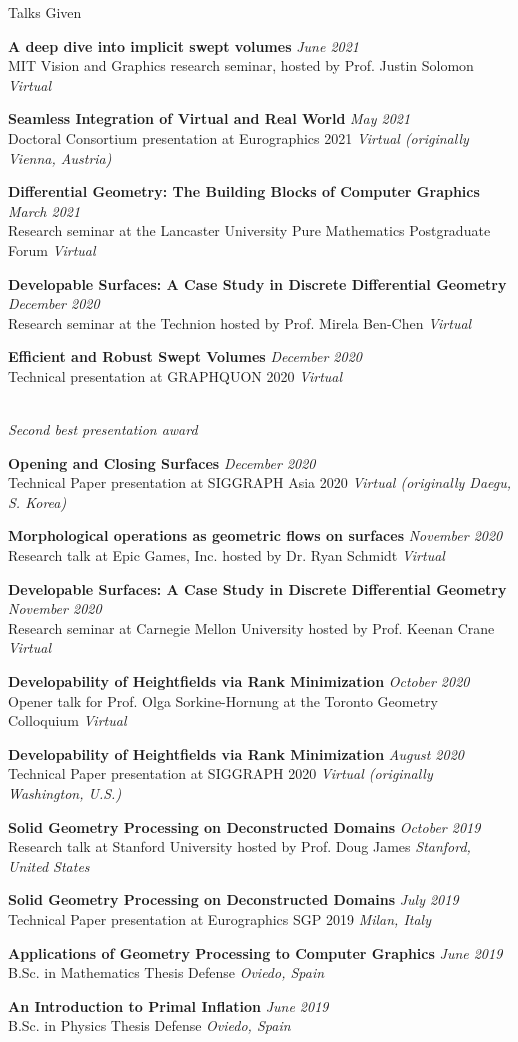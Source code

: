 \documentclass{resume}
\newcommand{\talk}[4]{
    {\bf #1} \hfill {\em \small #2} \\ %
    {\small #3} \hfill {\em \small #4}
}
\begin{document}
\begin{rSection}{Talks Given}
\talk{A deep dive into implicit swept volumes}{June 2021}
{MIT Vision and Graphics research seminar, hosted by Prof. Justin Solomon}{Virtual}

\talk{Seamless Integration of Virtual and Real World}{May 2021}
{Doctoral Consortium presentation at Eurographics 2021}{Virtual (originally Vienna, Austria)}

\talk{Differential Geometry: The Building Blocks of Computer Graphics}{March 2021}
{Research seminar at the Lancaster University Pure Mathematics Postgraduate Forum}{Virtual}

\talk{Developable Surfaces: A Case Study in Discrete Differential Geometry}{December 2020}
{Research seminar at the Technion hosted by Prof. Mirela Ben-Chen}{Virtual}

\talk{Efficient and Robust Swept Volumes}{December 2020}
{Technical presentation at GRAPHQUON 2020}{Virtual}
\\{\it Second best presentation award}

\talk{Opening and Closing Surfaces}{December 2020}
{Technical Paper presentation at SIGGRAPH Asia 2020}{Virtual (originally Daegu, S. Korea)}

\talk{Morphological operations as geometric flows on surfaces}{November 2020}
{Research talk at Epic Games, Inc. hosted by Dr. Ryan Schmidt}{Virtual}

\talk{Developable Surfaces: A Case Study in Discrete Differential Geometry}{November 2020}
{Research seminar at Carnegie Mellon University hosted by Prof. Keenan Crane}{Virtual}

\talk{Developability of Heightfields via Rank Minimization}{October 2020}
{Opener talk for Prof. Olga Sorkine-Hornung at the Toronto Geometry Colloquium}{Virtual}

\talk{Developability of Heightfields via Rank Minimization}{August 2020}
{Technical Paper presentation at SIGGRAPH 2020}{Virtual (originally Washington, U.S.)}

\talk{Solid Geometry Processing on Deconstructed Domains}{October 2019}
{Research talk at Stanford University hosted by Prof. Doug James}{Stanford, United States}

\talk{Solid Geometry Processing on Deconstructed Domains}{July 2019}
{Technical Paper presentation at Eurographics SGP 2019}{Milan, Italy}

\talk{Applications of Geometry Processing to Computer Graphics}{June 2019}
{B.Sc. in Mathematics Thesis Defense}{Oviedo, Spain}

\talk{An Introduction to Primal Inflation}{June 2019}
{B.Sc. in Physics Thesis Defense}{Oviedo, Spain}


\end{rSection}
\end{document}
